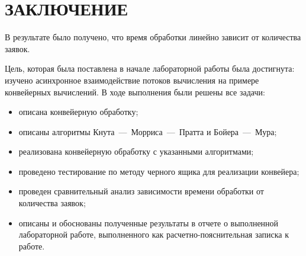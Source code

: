 \chapter*{ЗАКЛЮЧЕНИЕ}

В результате было получено, что время обработки линейно зависит от количества заявок.

Цель, которая была поставлена в начале лабораторной работы была достигнута: изучено асинхронное взаимодействие потоков вычисления на примере конвейерных вычислений. В ходе выполнения были решены все задачи:

\begin{itemize}[label=---]
	\item описана конвейерную обработку;
	\item описаны алгоритмы Кнута~---~Морриса~---~Пратта и Бойера~---~Мура;
	\item реализована конвейерную обработку с указанными алгоритмами;
	
	\item проведено тестирование по методу черного ящика для реализации конвейера;
	
	\item проведен сравнительный анализ зависимости времени обработки от количества заявок;
	
	\item описаны и обоснованы полученные результаты в отчете о выполненной лабораторной работе, выполненного как расчетно-пояснительная записка к работе.
\end{itemize}